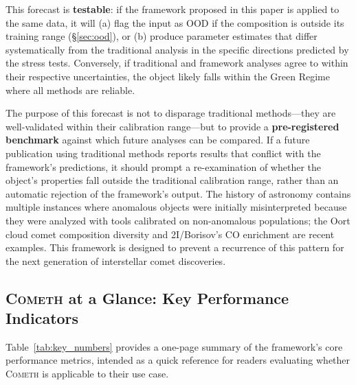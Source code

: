 \documentclass[usenatbib]{mnras}
\begin{document}
This forecast is \textbf{testable}: if the framework proposed in this paper is applied to the same data, it will (a) flag the input as OOD if the composition is outside its training range (\S\ref{sec:ood}), or (b) produce parameter estimates that differ systematically from the traditional analysis in the specific directions predicted by the stress tests. Conversely, if traditional and framework analyses agree to within their respective uncertainties, the object likely falls within the Green Regime where all methods are reliable.

The purpose of this forecast is not to disparage traditional methods---they are well-validated within their calibration range---but to provide a \textbf{pre-registered benchmark} against which future analyses can be compared. If a future publication using traditional methods reports results that conflict with the framework's predictions, it should prompt a re-examination of whether the object's properties fall outside the traditional calibration range, rather than an automatic rejection of the framework's output. The history of astronomy contains multiple instances where anomalous objects were initially misinterpreted because they were analyzed with tools calibrated on non-anomalous populations; the Oort cloud comet composition diversity and 2I/Borisov's CO enrichment are recent examples. This framework is designed to prevent a recurrence of this pattern for the next generation of interstellar comet discoveries.

\subsection{\texorpdfstring{\textsc{Cometh}}{COMETH} at a Glance: Key Performance Indicators}

Table~\ref{tab:key_numbers} provides a one-page summary of the framework's core performance metrics, intended as a quick reference for readers evaluating whether \textsc{Cometh} is applicable to their use case.
\end{document}
